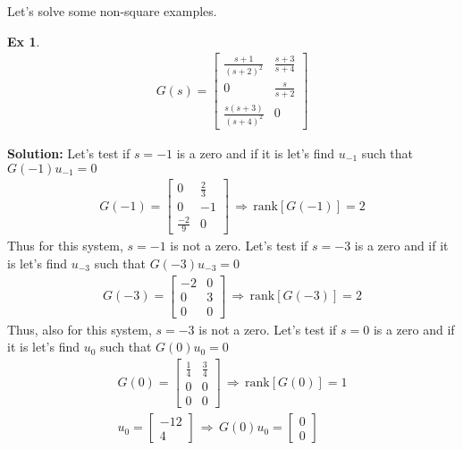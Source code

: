 \documentclass[twoside]{article}
\newtheorem{exmp}[theorem]{Ex}
\begin{document}
Let's solve some non-square examples.
%
\begin{exmp}
	\begin{align*}
	G(s) = \left[ \begin{array}{ccc} \frac{s+1}{(s+2)^2} & \frac{s+3}{s+4}  \\  
	0 & \frac{s}{s+2}  
        \\
        \frac{s(s+3)}{(s+4)^2}  & 0
        \end{array} \right]
	\end{align*}
\end{exmp}
%
\textbf{Solution:} Let's test if $s = -1$ is a zero and if it is let's find $u_{-1}$ such that $G(-1) u_{-1} = 0$
%
\begin{align*}
	G(-1) = \left[ \begin{array}{ccc} 0 & \frac{2}{3}  \\  
	0 & -1  
        \\
        \frac{-2}{9}  & 0
        \end{array} \right] \, \Rightarrow \, \mathrm{rank}[G(-1)] = 2  
\end{align*}
%
Thus for this system, $s = -1$ is not a zero. Let's test if $s = -3$ is a zero and if it is let's find $u_{-3}$ such that $G(-3) u_{-3} = 0$
%
\begin{align*}
	G(-3) = \left[ \begin{array}{ccc} -2 & 0 \\  
	0 & 3  
        \\
        0  & 0
        \end{array} \right] \, \Rightarrow \, \mathrm{rank}[G(-3)] = 2  
\end{align*}
%
Thus, also for this system, $s = -3$ is not a zero. Let's test if $s = 0$ is a zero and if it is let's find $u_{0}$ such that $G(0) u_{0} = 0$
%
\begin{align*}
	G(0) = \left[ \begin{array}{ccc} \frac{1}{4} & \frac{3}{4}  \\  
	0 & 0
        \\
        0  & 0
        \end{array} \right] \, \Rightarrow \, \mathrm{rank}[G(0)] = 1  
        \\
        u_0 = \begin{bmatrix} -12 \\ 4 \end{bmatrix} \, \Rightarrow \, G(0) u_0 = \begin{bmatrix} 0 \\ 0 \end{bmatrix}
\end{align*}
\end{document}
